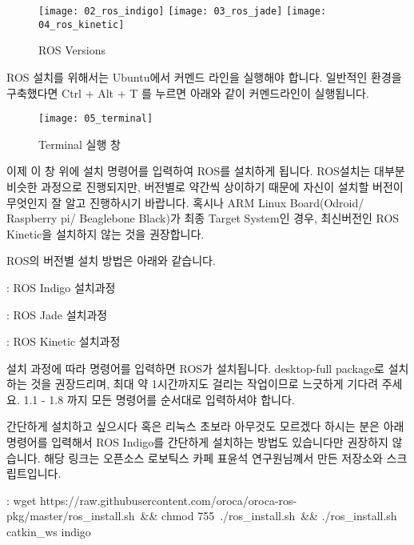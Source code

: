 \documentclass[11pt,fleqn]{book} %
\begin{document}
\begin{figure}[h]
\texttt{[image: 02\_ros\_indigo]}
\texttt{[image: 03\_ros\_jade]}
\texttt{[image: 04\_ros\_kinetic]}
\caption{ROS Versions}
\end{figure}

ROS 설치를 위해서는 Ubuntu에서 커멘드 라인을 실행해야 합니다.
일반적인 환경을 구축했다면 Ctrl + Alt + T 를 누르면 아래와 같이 커멘드라인이 실행됩니다.

\begin{figure}[h]
\centering\texttt{[image: 05\_terminal]}
\caption{Terminal 실행 창}
\end{figure}

이제 이 창 위에 설치 명령어를 입력하여 ROS를 설치하게 됩니다. ROS설치는 대부분 비슷한 과정으로 진행되지만, 버전별로 약간씩 상이하기 때문에
자신이 설치할 버전이 무엇인지 잘 알고 진행하시기 바랍니다. 혹시나 ARM Linux Board(Odroid/ Raspberry pi/ Beaglebone Black)가
최종 Target System인 경우, 최신버전인 ROS Kinetic을 설치하지 않는 것을 권장합니다.

ROS의 버전별 설치 방법은 아래와 같습니다.

\begin{link}
  : ROS Indigo 설치과정
\end{link}

\begin{link}
  : ROS Jade 설치과정
\end{link}

\begin{link}
  : ROS Kinetic 설치과정
\end{link}

설치 과정에 따라 명령어를 입력하면 ROS가 설치됩니다. desktop-full package로 설치하는 것을 권장드리며,
최대 약 1시간까지도 걸리는 작업이므로 느긋하게 기다려 주세요.
1.1 - 1.8 까지 모든 명령어를 순서대로 입력하셔야 합니다.

간단하게 설치하고 싶으시다 혹은 리눅스 초보라 아무것도 모르겠다 하시는 분은 아래 명령어를 입력해서 ROS Indigo를 간단하게 설치하는 방법도 있습니다만 권장하지 않습니다.
해당 링크는 오픈소스 로보틱스 카페 표윤석 연구원님꼐서 만든 저장소와 스크립트입니다.

\begin{link}
  : wget https://raw.githubusercontent.com/oroca/oroca-ros-pkg/master/ros\_install.sh\, \&\& chmod 755\, ./ros\_install.sh\, \&\& ./ros\_install.sh\, catkin\_ws indigo
\end{link}
\end{document}

